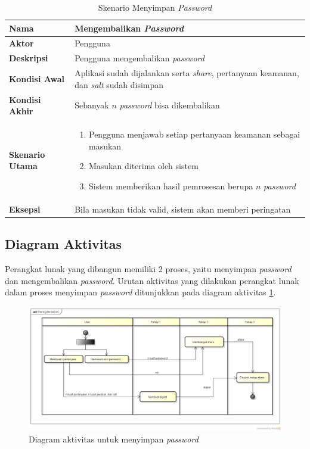 \begin{table}[H]
	\centering
	\caption{Skenario Menyimpan \textit{Password}} \label{table:scenario2}
	\begin{tabular}{|l|p{12cm}|}
		\hline
		\textbf{Nama} 					& Mengembalikan \textit{Password} 																									\\ \hline
		\textbf{Aktor}					& Pengguna																																					\\ \hline
		\textbf{Deskripsi} 			& Pengguna mengembalikan \textit{password} 																					\\ \hline
		\textbf{Kondisi Awal} 	& Aplikasi sudah dijalankan	serta \textit{share}, pertanyaan keamanan, dan \textit{salt} sudah disimpan  \\ \hline
		\textbf{Kondisi Akhir}	& Sebanyak $n$ \textit{password} bisa dikembalikan																	\\ \hline
		\textbf{Skenario Utama} & \begin{enumerate}[itemsep=0mm]\item Pengguna menjawab setiap pertanyaan keamanan sebagai masukan \item Masukan diterima oleh sistem \item Sistem memberikan hasil pemrosesan berupa $n$ \textit{password}\end{enumerate} \\ \hline
		\textbf{Eksepsi}				& Bila masukan tidak valid, sistem akan memberi peringatan \\ \hline
	\end{tabular}
\end{table}

\subsection{Diagram Aktivitas}

Perangkat lunak yang dibangun memiliki 2 proses, yaitu menyimpan \textit{password} dan mengembalikan \textit{password}. Urutan aktivitas yang dilakukan perangkat lunak dalam proses menyimpan \textit{password} ditunjukkan pada diagram aktivitas \ref{fig:activity1}.

\begin{figure}[H]
	\centerline{\includegraphics[scale=0.4]{Gambar/sharing-secret}}
	\caption{Diagram aktivitas untuk menyimpan \textit{password}}\label{fig:activity1}
\end{figure}

